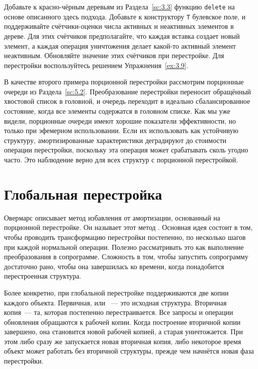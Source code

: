 \begin{exercise}\label{ex:8.1}
  Добавьте к красно-чёрным деревьям из Раздела~\ref{sc:3.3} функцию
  \lstinline!delete! на основе описанного здесь подхода. Добавьте к
  конструктору \lstinline!T! булевское поле, и поддерживайте
  счётчики-оценки числа
  активных и неактивных элементов в дереве. Для этих счётчиков
  предполагайте, что каждая вставка создает новый элемент, а каждая
  операция уничтожения делает какой-то активный элемент
  неактивным. Обновляйте значение этих счётчиков при перестройке.  Для
  перестройки воспользуйтесь решением Упражнения~\ref{ex:3.9}.
\end{exercise}

В качестве второго примера порционной перестройки рассмотрим
порционные очереди из Раздела~\ref{sc:5.2}. Преобразование перестройки
переносит обращённый хвостовой список в головной, и очередь переходит
в идеально сбалансированное состояние, когда все элементы содержатся в
головном списке.  Как мы уже видели, порционные очереди имеют хорошие
показатели эффективности, но только при эфемерном использовании. Если
их использовать как устойчивую структуру, амортизированные характеристики
деградируют до стоимости операции перестройки, поскольку эта операция
может срабатывать сколь угодно часто. Это наблюдение верно для всех
структур с порционной перестройкой.

\section{Глобальная перестройка}
\label{sc:8.2}

Овермарс \cite{Overmars1983} описывает метод избавления от амортизации,
основанный на порционной перестройке. Он называет этот метод
. Основная идея
состоит в том, чтобы проводить трансформацию перестройки постепенно,
по несколько шагов при каждой нормальной операции. Полезно
рассматривать это как выполнение преобразования в
сопрограмме. Сложность в том, чтобы запустить сопрограмму достаточно
рано, чтобы она завершилась ко времени, когда понадобится
перестроенная структура.

Более конкретно, при глобальной перестройке поддерживаются две копии
каждого объекта. Первичная, или ~--- это
исходная структура. Вторичная копия~--- та, которая постепенно
перестраивается. Все запросы и операции обновления обращаются к рабочей
копии. Когда построение вторичной копии завершено, она становится
новой рабочей копией, а старая уничтожается. При этом либо сразу же
запускается новая вторичная копия, либо некоторое время объект может
работать без вторичной структуры, прежде чем начнётся новая фаза
перестройки.

